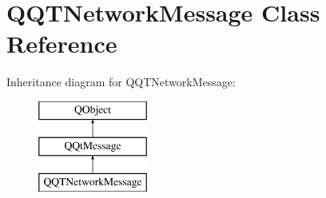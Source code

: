 \hypertarget{class_q_q_t_network_message}{}\section{Q\+Q\+T\+Network\+Message Class Reference}
\label{class_q_q_t_network_message}
Inheritance diagram for Q\+Q\+T\+Network\+Message\+:\begin{figure}[H]
\begin{center}
\leavevmode
\includegraphics[height=3.000000cm]{class_q_q_t_network_message}
\end{center}
\end{figure}

